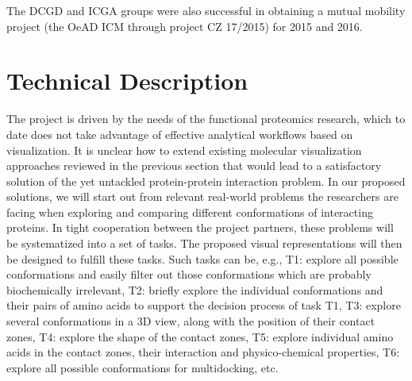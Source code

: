 \documentclass[11pt,a4paper,titlepage,oneside,onecolumn]{article}
\begin{document}
The DCGD and ICGA groups were also successful in obtaining a mutual mobility project (the OeAD ICM through project CZ 17/2015) for 2015 and 2016.


\section{Technical Description}
\label{sec:TechnicalDescription}
The project is driven by the needs of the functional proteomics research, which to date does not take advantage of effective analytical workflows based on visualization.
It is unclear how to extend existing molecular visualization approaches reviewed in the previous section that would lead to a satisfactory solution of the yet untackled protein-protein interaction problem.
In our proposed solutions, we will start out from relevant real-world problems the researchers are facing when exploring and comparing different conformations of interacting proteins.
In tight cooperation between the project partners, these problems will be systematized into a set of tasks. 
The proposed visual representations will then be designed to fulfill these tasks.
Such tasks can be, e.g., T1: explore all possible conformations and easily filter out those conformations which are probably biochemically irrelevant, T2: briefly explore the individual conformations and their pairs of amino acids to support the decision process of task T1, T3: explore several conformations in a 3D view, along with the position of their contact zones, T4: explore the shape of the contact zones, T5: explore individual amino acids in the contact zones, their interaction and physico-chemical properties, T6: explore all possible conformations for multidocking, etc.
\end{document}
